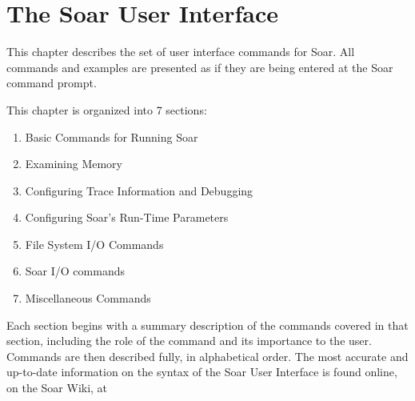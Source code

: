 \chapter{The Soar User Interface}
\label{INTERFACE}




This chapter describes the set of user interface commands for Soar. All commands and examples are presented as 
if they are being entered at the Soar command prompt.

This chapter is organized into 7 sections:
\begin{enumerate}
\item Basic Commands for Running Soar
\item Examining Memory
\item Configuring Trace Information and Debugging
\item Configuring Soar's Run-Time Parameters
\item File System I/O Commands
\item Soar I/O commands
\item Miscellaneous Commands
\end{enumerate}

Each section begins with a summary description of the commands covered
in that section, including the role of the command and its importance
to the user.  Commands are then described fully, in alphabetical order.
The most accurate and up-to-date information on the syntax of the Soar 
User Interface is found online, on the Soar Wiki, at

